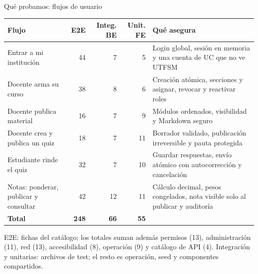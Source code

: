 \begin{frame}{Qué probamos: flujos de usuario}
\scriptsize
\renewcommand{\arraystretch}{1.15}
\begin{tabularx}{\textwidth}{>{\raggedright\arraybackslash}p{3.6cm}rrrY}
\toprule
\textbf{Flujo} & \textbf{E2E} & \textbf{Integ. BE} & \textbf{Unit. FE} & \textbf{Qué asegura} \\
\midrule
Entrar a mi institución & 44 & 7 & 5 & Login global, sesión en memoria y una cuenta de UC que no ve UTFSM \\
Docente arma su curso & 38 & 8 & 6 & Creación atómica, secciones y asignar, revocar y reactivar roles \\
Docente publica material & 16 & 7 & 9 & Módulos ordenados, visibilidad y Markdown seguro \\
Docente crea y publica un quiz & 18 & 7 & 11 & Borrador validado, publicación irreversible y pauta protegida \\
Estudiante rinde el quiz & 32 & 7 & 10 & Guardar respuestas, envío atómico con autocorrección y cancelación \\
Notas: ponderar, publicar y consultar & 42 & 12 & 11 & Cálculo decimal, pesos congelados, nota visible solo al publicar y auditoría \\
\midrule
\textbf{Total} & \textbf{248} & \textbf{66} & \textbf{55} & \\
\bottomrule
\end{tabularx}
\vspace{0.2cm}

E2E: fichas del catálogo; los totales suman además permisos (13), administración (11), red (13), accesibilidad (8), operación (9) y catálogo de API (4). Integración y unitarias: archivos de test; el resto es operación, seed y componentes compartidos.\\[0.15cm]
\centering
{}
\end{frame}

